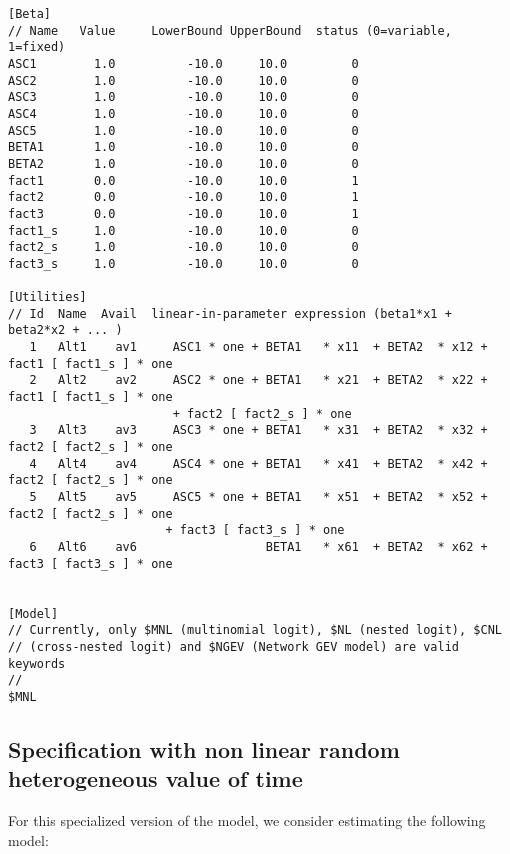 \documentclass[12pt]{memoir}
\begin{document}
\tiny
{\footnotesize
\begin{verbatim}
[Beta]
// Name   Value     LowerBound UpperBound  status (0=variable, 1=fixed)
ASC1        1.0          -10.0     10.0         0
ASC2        1.0          -10.0     10.0         0
ASC3        1.0          -10.0     10.0         0
ASC4        1.0          -10.0     10.0         0
ASC5        1.0          -10.0     10.0         0
BETA1       1.0          -10.0     10.0         0
BETA2       1.0          -10.0     10.0         0
fact1       0.0          -10.0     10.0         1
fact2       0.0          -10.0     10.0         1
fact3       0.0          -10.0     10.0         1
fact1_s     1.0          -10.0     10.0         0
fact2_s     1.0          -10.0     10.0         0
fact3_s     1.0          -10.0     10.0         0

[Utilities]
// Id  Name  Avail  linear-in-parameter expression (beta1*x1 + beta2*x2 + ... )
   1   Alt1    av1     ASC1 * one + BETA1   * x11  + BETA2  * x12 + fact1 [ fact1_s ] * one
   2   Alt2    av2     ASC2 * one + BETA1   * x21  + BETA2  * x22 + fact1 [ fact1_s ] * one 
                       + fact2 [ fact2_s ] * one
   3   Alt3    av3     ASC3 * one + BETA1   * x31  + BETA2  * x32 + fact2 [ fact2_s ] * one
   4   Alt4    av4     ASC4 * one + BETA1   * x41  + BETA2  * x42 + fact2 [ fact2_s ] * one
   5   Alt5    av5     ASC5 * one + BETA1   * x51  + BETA2  * x52 + fact2 [ fact2_s ] * one 
                      + fact3 [ fact3_s ] * one
   6   Alt6    av6                  BETA1   * x61  + BETA2  * x62 + fact3 [ fact3_s ] * one
  

[Model]
// Currently, only $MNL (multinomial logit), $NL (nested logit), $CNL
// (cross-nested logit) and $NGEV (Network GEV model) are valid keywords
//
$MNL

\end{verbatim}
}
\normalsize

\subsection{Specification with non linear random heterogeneous value of time}

For this specialized version of the model, we consider estimating 
the following model:%
\end{document}
